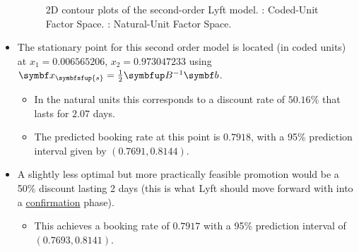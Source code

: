 \begin{itemize}
\begin{figure}[!htbp]
\begin{subfigure}{0.48\textwidth}
              \end{subfigure}
              \caption{2D contour plots of the second-order Lyft model.
                  : Coded-Unit Factor Space.
                  : Natural-Unit Factor Space.}\label{fig:Lyft}
          \end{figure}
    \item The stationary point for this second order model is located (in coded units) at $ x_1 = 0.006565206$,
          $ x_2 = 0.973047233 $ using $ \Vector{x}_{\symbfsfup{s}}=\frac{1}{2} \Matrix{B}^{-1}\Vector{b} $.
          \begin{itemize}
              \item In the natural units this corresponds to a discount rate of $50.16\%$ that lasts for $2.07$ days.
              \item The predicted booking rate at this point is $0.7918$, with a 95\% prediction interval given by $(0.7691, 0.8144)$.
          \end{itemize}
    \item A slightly less optimal but more practically feasible promotion would be a 50\% discount lasting 2 days (this is what Lyft should move forward with into a \underline{confirmation} phase).
          \begin{itemize}
              \item This achieves a booking rate of $0.7917$ with a 95\% prediction interval of $(0.7693, 0.8141)$.
          \end{itemize}
\end{itemize}
